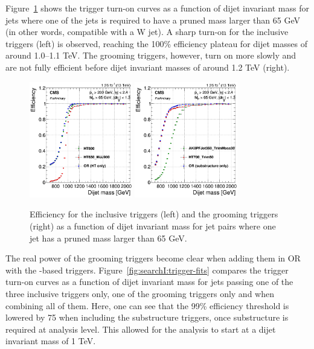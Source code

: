 \par Figure~\ref{fig:searchI:HT-mjj-trigger} shows the trigger turn-on curves as a function of dijet invariant mass for jets where one of the jets is required to have a pruned mass larger than 65 GeV (in other words, compatible with a W jet). A sharp turn-on for the inclusive triggers (left) is observed, reaching the 100\% efficiency plateau for dijet masses of around 1.0--1.1 TeV. The grooming triggers, however, turn on more slowly and are not fully efficient before dijet invariant masses of around 1.2 TeV (right).
\begin{figure}[htb]
\centering
\includegraphics[width=0.4\textwidth]{figures/analysis/search1/AN-15-211//triggereffMjj-HT.png}
\includegraphics[width=0.4\textwidth]{figures/analysis/search1/AN-15-211//triggereffMjj-SUBST.png}\\
\caption{Efficiency for the inclusive triggers (left) and the grooming triggers (right) as a function of dijet invariant mass for jet pairs where one jet has a pruned mass larger than 65 GeV.}
\label{fig:searchI:HT-mjj-trigger}
\end{figure}

The real power of the grooming triggers become clear when adding them in OR with the \HT-based triggers. Figure~\ref{fig:searchI:trigger-fits} compares the trigger turn-on curves as a function of dijet invariant mass for jets passing one of the three inclusive triggers only, one of the grooming triggers only and when combining all of them. Here, one can see that the 99\% efficiency threshold is lowered by 75 \GeV when including the substructure triggers, once substructure is required at analysis level.
This allowed for the analysis to start at a dijet invariant mass of 1 TeV.

